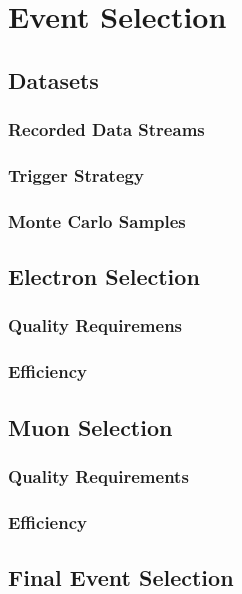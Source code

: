 \chapter{Event Selection}


\section{Datasets}
\subsection{Recorded Data Streams}
\subsection{Trigger Strategy}
\subsection{Monte Carlo Samples}

\section{Electron Selection}
\subsection{Quality Requiremens}
\subsection{Efficiency}

\section{Muon Selection}
\subsection{Quality Requirements}
\subsection{Efficiency}

\section{Final Event Selection}
